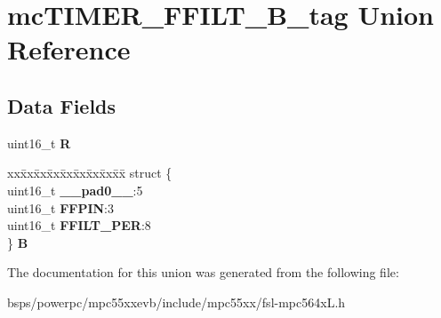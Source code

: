 \hypertarget{unionmcTIMER__FFILT__16B__tag}{}\section{mc\+T\+I\+M\+E\+R\+\_\+\+F\+F\+I\+L\+T\+\_\+B\+\_\+tag Union Reference}
\label{unionmcTIMER__FFILT__16B__tag}
\subsection*{Data Fields}
\begin{DoxyCompactItemize}
\item 
\mbox{\label{unionmcTIMER__FFILT__16B__tag_acb0af28be8fee1b90ac5a1d85d83d8b2}} 
uint16\+\_\+t {\bfseries R}
\item 
\mbox{\label{unionmcTIMER__FFILT__16B__tag_a8bba1822baa9bec48f7192ab52f7e575}} 
\begin{tabbing}
xx\=xx\=xx\=xx\=xx\=xx\=xx\=xx\=xx\=\kill
struct \{\\
\>uint16\_t {\bfseries \_\_pad0\_\_}:5\\
\>uint16\_t {\bfseries FFPIN}:3\\
\>uint16\_t {\bfseries FFILT\_PER}:8\\
\} {\bfseries B}\\

\end{tabbing}\end{DoxyCompactItemize}


The documentation for this union was generated from the following file\+:\begin{DoxyCompactItemize}
\item 
bsps/powerpc/mpc55xxevb/include/mpc55xx/fsl-\/mpc564x\+L.\+h\end{DoxyCompactItemize}
